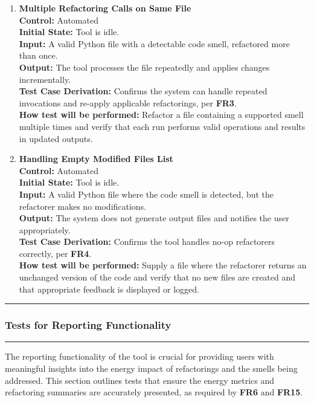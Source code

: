 \documentclass[12pt, titlepage]{article}
\newcommand{\colorrule}{\textcolor{BlueViolet}{\rule{\linewidth}{2pt}}}
\begin{document}
\begin{enumerate}[label={\bf
\textcolor{Maroon}{test-FR-IA-\arabic*}}, wide=0pt, font=\itshape]
\item \textbf{Multiple Refactoring Calls on Same File} \\[2mm]
\textbf{Control:} Automated \\
\textbf{Initial State:} Tool is idle. \\
\textbf{Input:} A valid Python file with a detectable code smell, refactored more than once. \\
\textbf{Output:} The tool processes the file repeatedly and applies changes incrementally. \\[2mm]
\textbf{Test Case Derivation:} Confirms the system can handle repeated invocations and re-apply applicable refactorings, per \textbf{FR3}. \\[2mm]
\textbf{How test will be performed:} Refactor a file containing a supported smell multiple times and verify that each run performs valid operations and results in updated outputs.

\item \textbf{Handling Empty Modified Files List} \\[2mm]
\textbf{Control:} Automated \\
\textbf{Initial State:} Tool is idle. \\
\textbf{Input:} A valid Python file where the code smell is detected, but the refactorer makes no modifications. \\
\textbf{Output:} The system does not generate output files and notifies the user appropriately. \\[2mm]
\textbf{Test Case Derivation:} Confirms the tool handles no-op refactorers correctly, per \textbf{FR4}. \\[2mm]
\textbf{How test will be performed:} Supply a file where the refactorer returns an unchanged version of the code and verify that no new files are created and that appropriate feedback is displayed or logged.

\end{enumerate}

\noindent\colorrule

\subsubsection{Tests for Reporting Functionality}
\colorrule

\medskip

\noindent
The reporting functionality of the tool is crucial for providing
users with meaningful insights into the energy impact of refactorings
and the smells being addressed. This section outlines tests that
ensure the energy metrics and refactoring summaries are accurately
presented, as required by \textbf{FR6} and \textbf{FR15}.
\end{document}

